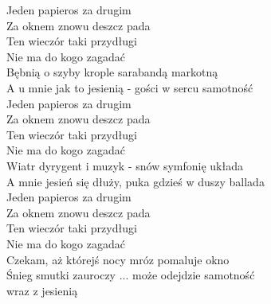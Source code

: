 
\begin{flushleft}
Jeden papieros za drugim \tab{}\tab{}\\
Za oknem znowu deszcz pada \tab{}\tab{}\\
Ten wieczór taki przydługi \tab{}\tab{}\\
Nie ma do kogo zagadać \tab{}\tab{}\\
Bębnią o szyby krople sarabandą markotną \tab{} \\
A u mnie jak to jesienią - gości w sercu samotność \\
\vskip 3mm
Jeden papieros za drugim \\
Za oknem znowu deszcz pada \\
Ten wieczór taki przydługi \\
Nie ma do kogo zagadać \\
Wiatr dyrygent i muzyk - snów symfonię układa \\
A mnie jesień się dłuży, puka gdzieś w duszy ballada \\
\vskip 3mm
Jeden papieros za drugim \\
Za oknem znowu deszcz pada \\
Ten wieczór taki przydługi \\
Nie ma do kogo zagadać \\
Czekam, aż którejś nocy mróz pomaluje okno \\
Śnieg smutki zauroczy ... może odejdzie samotność \\
wraz z jesienią \tab {} \tab{} \tab{} \\
\vskip 3mm
\end{flushleft}

\clearpage